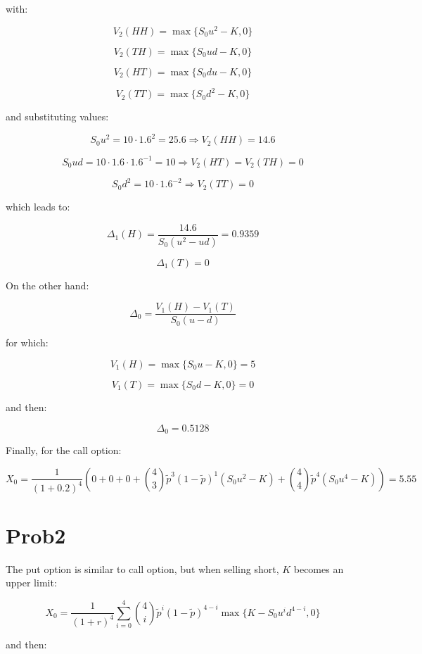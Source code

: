 \documentclass[paper=a4, fontsize=11pt]{scrartcl} %
\numberwithin{equation}{section} %
\numberwithin{figure}{section} %
\numberwithin{table}{section} %
\begin{document}
with:

$$ V_{2} (HH) = \max \{ S_{0}u^{2} - K, 0 \} $$

$$ V_{2} (TH) = \max \{ S_{0}ud - K, 0 \} $$

$$ V_{2} (HT) = \max \{ S_{0}du - K, 0 \} $$

$$ V_{2} (TT) = \max \{ S_{0}d^{2} - K, 0 \} $$

and substituting values:

$$ S_{0}u^{2} = 10 \cdot 1.6^{2} = 25.6 \Rightarrow V_{2}(HH) = 14.6 $$

$$ S_{0}ud = 10 \cdot 1.6 \cdot 1.6^{-1} = 10 \Rightarrow V_{2}(HT) = V_{2}(TH) = 0 $$

$$ S_{0}d^{2} = 10 \cdot 1.6^{-2} \Rightarrow V_{2}(TT) = 0 $$

which leads to:

$$ \Delta_{1}(H) = \frac{14.6}{S_{0}(u^{2} - ud) } = 0.9359$$

$$ \Delta_{1}(T) = 0 $$

On the other hand:

$$ \Delta_{0} = \frac{V_{1}(H) - V_{1}(T)}{S_{0}(u-d)} $$

for which:

$$ V_{1}(H) = \max \{ S_{0}u - K, 0 \} = 5 $$

$$ V_{1}(T) = \max \{ S_{0}d - K, 0 \} = 0 $$

and then:

$$ \Delta_{0} = 0.5128 $$

Finally, for the call option:

$$ X_{0} = \frac{1}{(1+0.2)^{4}} \left( 0 + 0 + 0 + {4 \choose 3}\widetilde{p}^{3}(1-\widetilde{p})^{1}(S_{0}u^{2}-K) + {4 \choose 4}\widetilde{p}^{4}(S_{0}u^{4}-K) \right) =  5.55 $$





\newpage

\section{Prob2}

The put option is similar to call option, but when selling short, $K$ becomes an upper limit:

$$ X_{0} = \frac{1}{(1+r)^{4}}\sum_{i=0}^{4}{4 \choose i} \widetilde{p}^{i}(1-\widetilde{p})^{4-i}\max \{ K - S_{0}u^{i}d^{4-i}, 0 \} $$

and then:
\end{document}
